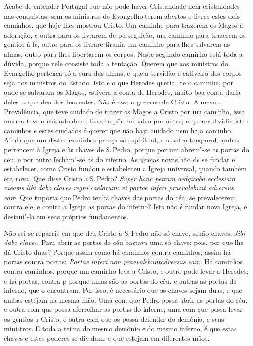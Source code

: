 Acabe de entender Portugal que não pode haver Cristandade nem
cristandades nas conquistas, sem os ministros do Evangelho terem abertos
e livres estes dois caminhos, que hoje lhes mostrou Cristo. Um caminho
para trazerem os Magos à adoração, e outra para os livrarem de
perseguição, um caminho para trazerem os gentios à fé, outro para os
livrare tirania um caminho para lhes salvarem as almas, outro para lhes
libertarem os corpos. Neste segundo caminho está toda a dúvida, porque
nele consiste toda a tentação. Querem que aos ministros do Evangelho
pertença só a cura das almas, e que a servidão e cativeiro dos corpos
seja dos ministros do Estado. Isto é o que Herodes queria. Se o caminho,
por onde se salvaram os Magos, estivera à conta de Herodes, muito boa
conta daria deles: a que deu dos Inocentes. Não é esse o governo de
Cristo. A mesma Providência, que teve cuidado de trazer os Magos a
Cristo por um caminho, essa mesma teve o cuidado de os livrar e pôr em
salvo por outro; e querer dividir estes caminhos e estes cuidados é
querer que não haja cuidado nem haja caminho. Ainda que um destes
caminhos pareça só espiritual, e o outro temporal, ambos pertencem à
Igreja e às chaves de S.\,Pedro, porque por um abrem"-se as portas do céu,
e por outro fecham"-se as do inferno. As igrejas novas hão de se fundar
e estabelecer, como Cristo fundou e estabeleceu a Igreja universal,
quando também era nova. Que disse Cristo a S.\,Pedro? \emph{Super hanc
petram aedqicabo ecclesiam meams libi dabo claves regni caelorum: et
portae inferi praevalebunt adversus eam}. Que importa que
Pedro tenha chaves das portas do céu, se prevalecerem contra ele, e
contra a Igreja as portas do inferno? Isto não é fundar nova Igreja, é
destruí"-la em seus próprios fundamentos.

Não sei se reparais em que deu Cristo a S.\,Pedro não só chave, senão
chaves: \emph{Jibi dabo claves.} Para abrir as portas do céu bastava uma
só chave: pois, por que lhe dá Cristo duas? Porque assim como há
caminhos contra caminhos, assim há portas contra portas:
\emph{Portae inferi non praevalebuntadversus eam.} Há caminhos contra
caminhos, porque um caminho leva a Cristo, e outro pode levar a Herodes;
e há portas, contra p porque umas são as portas do céu, e outras as
portas do inferno, que o encontram. Por isso, é necessário que as chaves
sejam duas, e que ambas estejam na mesma mão. Uma com que Pedro possa
abrir as portas do céu, e outra com que possa aferrolhar as portas do
inferno; uma com que possa levar os gentios a Cristo, e outra com que os
possa defender do demônio, e seus ministros. E toda a teima do mesmo
demônio e do mesmo inferno, é que estas chaves e estes poderes se
dividam, e que estejam em diferentes mãos.

